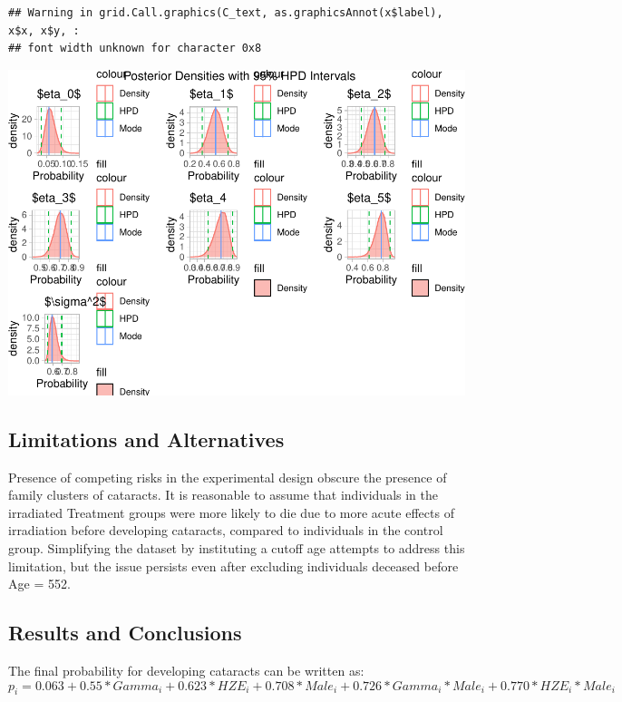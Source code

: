 \documentclass[
]{article}
\begin{document}
\begin{verbatim}
## Warning in grid.Call.graphics(C_text, as.graphicsAnnot(x$label), x$x, x$y, :
## font width unknown for character 0x8
\end{verbatim}

\includegraphics{final_report_files/figure-latex/postdens-1.pdf}

\hypertarget{limitations-and-alternatives}{%
\subsection{Limitations and
Alternatives}\label{limitations-and-alternatives}}

Presence of competing risks in the experimental design obscure the
presence of family clusters of cataracts. It is reasonable to assume
that individuals in the irradiated Treatment groups were more likely to
die due to more acute effects of irradiation before developing
cataracts, compared to individuals in the control group. Simplifying the
dataset by instituting a cutoff age attempts to address this limitation,
but the issue persists even after excluding individuals deceased before
Age = 552.

\hypertarget{results-and-conclusions}{%
\subsection{Results and Conclusions}\label{results-and-conclusions}}

The final probability for developing cataracts can be written as:\\
\[
p_i = 0.063 + 0.55*Gamma_i + 0.623*HZE_i + 0.708*Male_i + 0.726*Gamma_i*Male_i + 0.770*HZE_i*Male_i
\]
\end{document}
